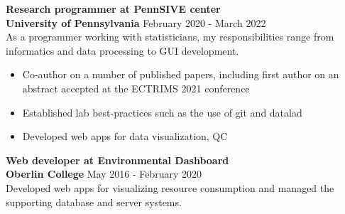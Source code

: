\documentclass[margin]{res}
\newcommand\rurl[1]{%
  \href{http://#1}{\nolinkurl{#1}}%
}
\begin{document}
\begin{resume}
\textbf{Research programmer at PennSIVE center}\\
\textbf{University of Pennsylvania} \hfill        February 2020 - March 2022\\
As a programmer working with statisticians, my responsibilities range from informatics and data processing to GUI development. %
\begin{itemize}
    \item Co-author on a number of published papers, including first author on an abstract accepted at the ECTRIMS 2021 conference
    \item Established lab best-practices such as the use of git and datalad
    \item Developed web apps for data visualization, QC
\end{itemize}

\textbf{Web developer at Environmental Dashboard}\\
\textbf{Oberlin College} \hfill        May 2016 - February 2020\\
Developed web apps for visualizing resource consumption and managed the supporting database and server systems.


\end{resume}
\end{document}

